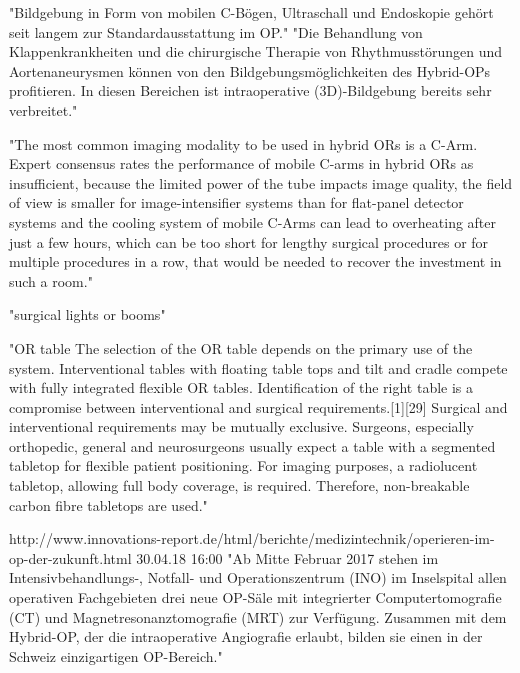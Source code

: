 	"Bildgebung in Form von mobilen C-Bögen, Ultraschall und Endoskopie gehört seit langem zur Standardausstattung im OP."
	"Die Behandlung von Klappenkrankheiten und die chirurgische Therapie von Rhythmusstörungen und Aortenaneurysmen können von den Bildgebungsmöglichkeiten des Hybrid-OPs profitieren. In diesen Bereichen ist intraoperative (3D)-Bildgebung bereits sehr verbreitet."
	
	"The most common imaging modality to be used in hybrid ORs is a C-Arm. Expert consensus rates the performance of mobile C-arms in hybrid ORs as insufficient, because the limited power of the tube impacts image quality, the field of view is smaller for image-intensifier systems than for flat-panel detector systems and the cooling system of mobile C-Arms can lead to overheating after just a few hours, which can be too short for lengthy surgical procedures or for multiple procedures in a row, that would be needed to recover the investment in such a room."
	
	"surgical lights or booms"
	
	"OR table
	The selection of the OR table depends on the primary use of the system. Interventional tables with floating table tops and tilt and cradle compete with fully integrated flexible OR tables. Identification of the right table is a compromise between interventional and surgical requirements.[1][29] Surgical and interventional requirements may be mutually exclusive. Surgeons, especially orthopedic, general and neurosurgeons usually expect a table with a segmented tabletop for flexible patient positioning. For imaging purposes, a radiolucent tabletop, allowing full body coverage, is required. Therefore, non-breakable carbon fibre tabletops are used."
	
	http://www.innovations-report.de/html/berichte/medizintechnik/operieren-im-op-der-zukunft.html 30.04.18 16:00	
	"Ab Mitte Februar 2017 stehen im Intensivbehandlungs-, Notfall- und Operationszentrum (INO) im Inselspital allen operativen Fachgebieten drei neue OP-Säle mit integrierter Computertomografie (CT) und Magnetresonanztomografie (MRT) zur Verfügung. Zusammen mit dem Hybrid-OP, der die intraoperative Angiografie erlaubt, bilden sie einen in der Schweiz einzigartigen OP-Bereich."
	
